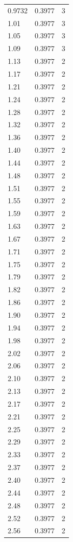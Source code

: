 \begin{longtable}{lrr}
  0.9732 & 0.3977 & 3 \\
  1.01 & 0.3977 & 3 \\
  1.05 & 0.3977 & 3 \\
  1.09 & 0.3977 & 3 \\
  1.13 & 0.3977 & 2 \\
  1.17 & 0.3977 & 2 \\
  1.21 & 0.3977 & 2 \\
  1.24 & 0.3977 & 2 \\
  1.28 & 0.3977 & 2 \\
  1.32 & 0.3977 & 2 \\
  1.36 & 0.3977 & 2 \\
  1.40 & 0.3977 & 2 \\
  1.44 & 0.3977 & 2 \\
  1.48 & 0.3977 & 2 \\
  1.51 & 0.3977 & 2 \\
  1.55 & 0.3977 & 2 \\
  1.59 & 0.3977 & 2 \\
  1.63 & 0.3977 & 2 \\
  1.67 & 0.3977 & 2 \\
  1.71 & 0.3977 & 2 \\
  1.75 & 0.3977 & 2 \\
  1.79 & 0.3977 & 2 \\
  1.82 & 0.3977 & 2 \\
  1.86 & 0.3977 & 2 \\
  1.90 & 0.3977 & 2 \\
  1.94 & 0.3977 & 2 \\
  1.98 & 0.3977 & 2 \\
  2.02 & 0.3977 & 2 \\
  2.06 & 0.3977 & 2 \\
  2.10 & 0.3977 & 2 \\
  2.13 & 0.3977 & 2 \\
  2.17 & 0.3977 & 2 \\
  2.21 & 0.3977 & 2 \\
  2.25 & 0.3977 & 2 \\
  2.29 & 0.3977 & 2 \\
  2.33 & 0.3977 & 2 \\
  2.37 & 0.3977 & 2 \\
  2.40 & 0.3977 & 2 \\
  2.44 & 0.3977 & 2 \\
  2.48 & 0.3977 & 2 \\
  2.52 & 0.3977 & 2 \\
  2.56 & 0.3977 & 2 \\

\end{longtable}
